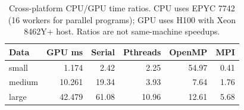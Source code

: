 \begin{table}[t]
\centering\caption{Cross-platform CPU/GPU time ratios. CPU uses EPYC 7742 (16 workers for parallel programs); GPU uses H100 with Xeon 8462Y+ host. Ratios are not same-machine speedups.}\label{tab:cross}
\small\setlength{\tabcolsep}{3pt}\begin{tabular}{lrrrrr}\toprule
Data & GPU ms & Serial & Pthreads & OpenMP & MPI \\
\midrule
small & 1.174 & 2.42 & 2.25 & 54.97 & 0.41 \\
medium & 10.261 & 19.34 & 3.93 & 7.64 & 1.76 \\
large & 42.479 & 61.08 & 10.96 & 12.61 & 5.68 \\
\bottomrule\end{tabular}
\end{table}
